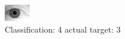 \begin{figure}[h!]
\begin{center}
\includegraphics[width=0.60\columnwidth]{figures/ID2170_class_4_target_3.png}
\end{center}
\caption{ Classification: 4 actual target: 3}
\label{fig:ID2170_class_4_target_3}
\end{figure}
